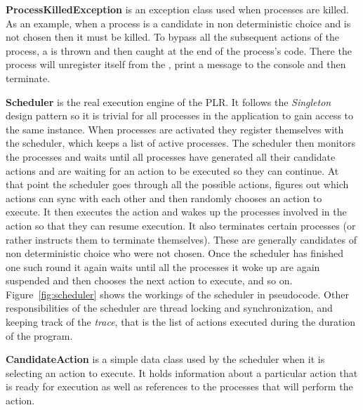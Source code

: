 	\textbf{ProcessKilledException} is an exception class used when processes
	are killed. As an example, when a process is a candidate in non deterministic
	choice and is not chosen then it must be killed. To bypass all the subsequent
	actions of the process, a  is thrown and then
	caught at the end of the process's code. There the process will unregister
	itself from the , print a message to the console and then
	terminate.
	
	\textbf{Scheduler} is the real execution engine of the PLR. It follows the
	\textit{Singleton} \cite{design_patterns} design pattern so it is trivial 
	for all	processes in the application to gain access to the same 
	 instance. When processes are activated they register 
	themselves with the scheduler, which keeps a list of active processes. The 
	scheduler then monitors the processes and waits until all processes have 
	generated all their candidate actions and are waiting for an action to be 
	executed so they can continue. At that point the scheduler goes through all 
	the possible actions, figures out which actions can sync with each other and 
	then randomly chooses an action to execute. It then executes the action and 
	wakes up the processes involved in the action so that they can resume 
	execution. It also terminates certain processes (or rather instructs them to 
	terminate themselves). These are generally candidates of non deterministic 
	choice who were not chosen. Once the scheduler has finished one such round 
	it again waits until all the processes it woke up are again suspended and 
	then chooses the next action to execute, and so on. 
	Figure~\ref{fig:scheduler} shows the workings of the scheduler in 
	pseudocode. Other responsibilities of the scheduler are thread locking and 
	synchronization, and keeping track of the \textit{trace}, that is the list 
	of actions executed during the duration of the program.
	 
	\textbf{CandidateAction} is a simple data class used by the scheduler when 
	it is selecting an action to execute. It holds information about a 
	particular action that is ready for execution as well as references to the 
	processes that will perform the action.

